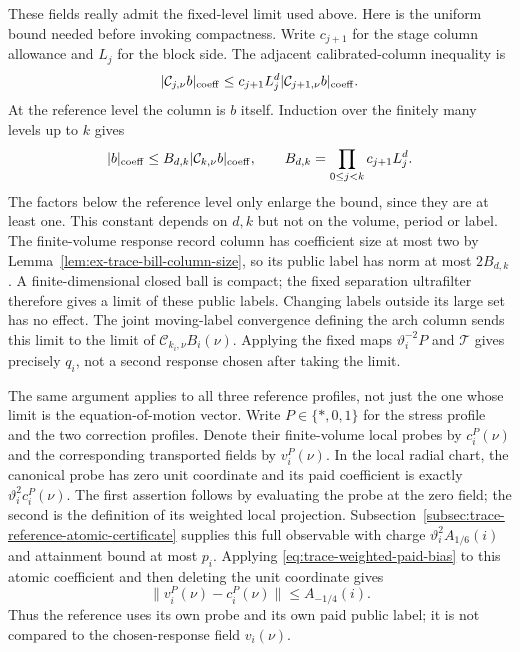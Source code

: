 These fields really admit the fixed-level limit used above. Here is
the uniform bound needed before invoking compactness. Write $c_{j+1}$
for the stage column allowance and $L_j$ for the block side. The adjacent
calibrated-column inequality is
\[
 |\mathcal C_{j,\nu}b|_{\rm coeff}
 \le c_{j+1}L_j^d|\mathcal C_{j+1,\nu}b|_{\rm coeff}.
\]
At the reference level the column is $b$ itself. Induction over the
finitely many levels up to $k$ gives
\begin{equation}
 |b|_{\rm coeff}\le B_{d,k}|\mathcal C_{k,\nu}b|_{\rm coeff},
 \qquad B_{d,k}=\prod_{0\le j<k}c_{j+1}L_j^d.
 \label{eq:trace-weighted-column-inverse}
\end{equation}
The factors below the reference level only enlarge the bound, since they
are at least one. This constant depends on $d,k$ but not on the volume,
period or label. The finite-volume response record column has coefficient size at most two by
Lemma~\ref{lem:ex-trace-bill-column-size}, so its public label has norm at
most $2B_{d,k}$. A finite-dimensional closed ball is compact; the fixed
separation ultrafilter therefore gives a limit of these public labels.
Changing labels outside its large set has no effect. The joint
moving-label convergence defining the arch column sends this limit to the
limit of $\mathcal C_{k_i,\nu}B_i(\nu)$. Applying the fixed maps
$\vartheta_i^{-2}P$ and $\mathcal T$ gives precisely $q_i$, not a second
response chosen after taking the limit.

The same argument applies to all three reference profiles, not just the
one whose limit is the equation-of-motion vector. Write $P\in\{*,0,1\}$
for the stress profile and the two correction profiles. Denote their
finite-volume local probes by $c_i^P(\nu)$ and the corresponding
transported fields by $v_i^P(\nu)$. In the local radial chart, the
canonical probe has zero unit coordinate and its paid coefficient is
exactly $\vartheta_i^2c_i^P(\nu)$. The first assertion follows by evaluating
the probe at the zero field; the second is the definition of its weighted
local projection. Subsection~\ref{subsec:trace-reference-atomic-certificate} supplies
this full observable with charge $\vartheta_i^2A_{1/6}(i)$ and
attainment bound at most $p_i$. Applying
\eqref{eq:trace-weighted-paid-bias} to this atomic coefficient and then deleting the unit coordinate gives
\begin{equation}
 \|v_i^P(\nu)-c_i^P(\nu)\|\le A_{-1/4}(i).
 \label{eq:trace-weighted-reference-bias}
\end{equation}
Thus the reference uses its own probe and its own paid public label;
it is not compared to the chosen-response field $v_i(\nu)$.


